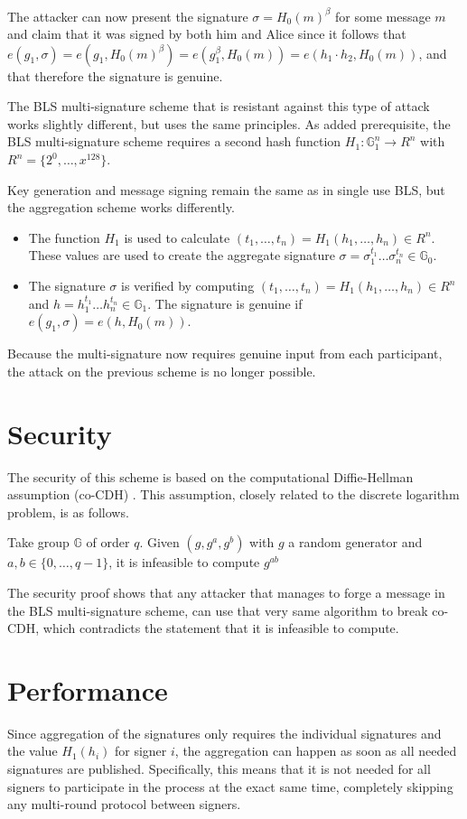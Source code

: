 The attacker can now present the signature $\sigma=H_0(m)^\beta$ for some message $m$ and claim that it was signed by both him and Alice since it follows that $e(g_1,\sigma)=e(g_1,H_0(m)^\beta)=e(g_1^\beta,H_0(m))=e(h_1\cdot h_2,H_0(m))$, and that therefore the signature is genuine.

The BLS multi-signature scheme that is resistant against this type of attack works slightly different, but uses the same principles. As added prerequisite, the BLS multi-signature scheme requires a second hash function $H_1:\mathbb{G}_1^n\to R^n$ with $R^n=\{2^0,\dots,x^128\}$.

Key generation and message signing remain the same as in single use BLS, but the aggregation scheme works differently.
\begin{itemize}
	\item The function $H_1$ is used to calculate $(t_1,\dots,t_n)=H_1(h_1,\dots,h_n)\in R^n$. These values are used to create the aggregate signature $\sigma=\sigma_1^{t_1}\dots\sigma_n^{t_n}\in\mathbb{G}_0$.
	\item The signature $\sigma$ is verified by computing $(t_1,\dots,t_n)=H_1(h_1,\dots,h_n)\in R^n$ and $h=h_1^{t_1}\dots h_n^{t_n}\in\mathbb{G}_1$. The signature is genuine if $e(g_1,\sigma)=e(h,H_0(m))$.
\end{itemize}
Because the multi-signature now requires genuine input from each participant, the attack on the previous scheme is no longer possible.
\section{Security}
The security of this scheme is based on the computational Diffie-Hellman assumption (co-CDH) \cite{CDH}. This assumption, closely related to the discrete logarithm problem, is as follows.
\begin{defn}
	Take group $\mathbb{G}$ of order $q$. Given $(g,g^a,g^b)$ with $g$ a random generator and $a,b\in\{0,\dots,q-1\}$, it is infeasible to compute $g^{ab}$
\end{defn}
The security proof shows that any attacker that manages to forge a message in the BLS multi-signature scheme, can use that very same algorithm to break co-CDH, which contradicts the statement that it is infeasible to compute.
\section{Performance}
Since aggregation of the signatures only requires the individual signatures and the value $H_1(h_i)$ for signer $i$, the aggregation can happen as soon as all needed signatures are published. Specifically, this means that it is not needed for all signers to participate in the process at the exact same time, completely skipping any multi-round protocol between signers.

